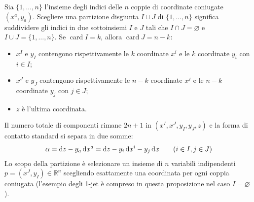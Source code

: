 \begin{remark}
    Sia $\{ 1, \dots, n \}$ l'insieme degli indici delle $n$ coppie di coordinate coniugate $(x^a, y_a)$.
    Scegliere una partizione disgiunta $I \sqcup J$ di $\{ 1, \dots, n \}$ significa suddividere gli indici in due sottoinsiemi $I$ e $J$ tali che $I \cap J = \varnothing$ e $I \cup J = \{ 1, \dots, n \}$.
    Se $\operatorname{card}I = k$, allora $\operatorname{card}J = n - k$:
    \begin{itemize}
        \item $x^I$ e $y_I$ contengono rispettivamente le $k$ coordinate $x^i$ e le $k$ coordinate $y_i$ con $i \in I$;
        \item $x^J$ e $y_J$ contengono rispettivamente le $n - k$ coordinate $x^j$ e le $n - k$ coordinate $y_j$ con $j \in J$;
        \item $z$ è l'ultima coordinata.
    \end{itemize}
    Il numero totale di componenti rimane $2n + 1$ in $\left( x^I, x^J, y_I, y_J, z \right)$ e la forma di contatto standard si separa in due somme:
    \[
        \alpha = \odif{z} - y_a \odif{x^a} = \odif{z} - y_i \odif{x^i} - y_j \odif{x} \qquad (i \in I, j \in J)
    \]
    Lo scopo della partizione è selezionare un insieme di $n$ variabili indipendenti $p = (x^J, y_I) \in \mathbb{R}^n$ scegliendo esattamente una coordinata per ogni coppia coniugata (l'esempio degli 1-jet è compreso in questa proposizione nel caso $I = \varnothing$).
\end{remark}

